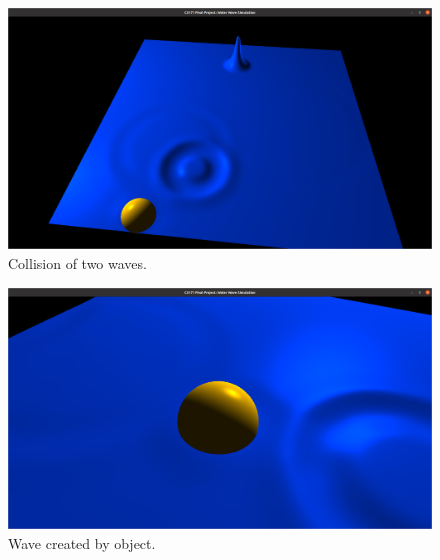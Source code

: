 \documentclass[acmtog]{acmart}
\begin{document}
\begin{figure}[H]
    \centering
    \includegraphics[scale=0.1]{image/Two waves.png}
    \caption{Collision of two waves.}
\end{figure}
\begin{figure}[H]
    \centering
    \includegraphics[scale=0.1]{image/Wave created by object.png}
    \caption{Wave created by object.}
\end{figure}
\end{document}
